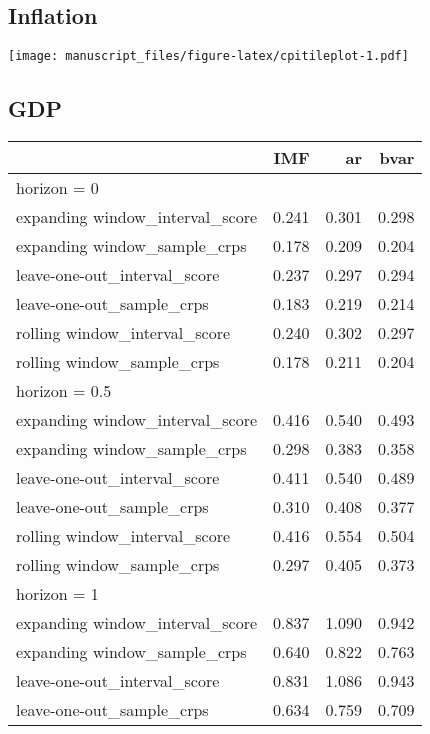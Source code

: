 \documentclass[
]{article}
\begin{document}
\hypertarget{inflation-2}{%
\subsection{Inflation}\label{inflation-2}}

\texttt{[image: manuscript\_files/figure-latex/cpitileplot-1.pdf]}

\hypertarget{gdp-2}{%
\subsection{GDP}\label{gdp-2}}

\begin{longtable}{l|rrr}
\toprule
\multicolumn{1}{l}{} & IMF & ar & bvar \\ 
\midrule
\multicolumn{4}{l}{horizon = 0} \\ 
\midrule
expanding window\_interval\_score & 0.241 & 0.301 & 0.298 \\ 
expanding window\_sample\_crps & 0.178 & 0.209 & 0.204 \\ 
leave-one-out\_interval\_score & 0.237 & 0.297 & 0.294 \\ 
leave-one-out\_sample\_crps & 0.183 & 0.219 & 0.214 \\ 
rolling window\_interval\_score & 0.240 & 0.302 & 0.297 \\ 
rolling window\_sample\_crps & 0.178 & 0.211 & 0.204 \\ 
\midrule
\multicolumn{4}{l}{horizon = 0.5} \\ 
\midrule
expanding window\_interval\_score & 0.416 & 0.540 & 0.493 \\ 
expanding window\_sample\_crps & 0.298 & 0.383 & 0.358 \\ 
leave-one-out\_interval\_score & 0.411 & 0.540 & 0.489 \\ 
leave-one-out\_sample\_crps & 0.310 & 0.408 & 0.377 \\ 
rolling window\_interval\_score & 0.416 & 0.554 & 0.504 \\ 
rolling window\_sample\_crps & 0.297 & 0.405 & 0.373 \\ 
\midrule
\multicolumn{4}{l}{horizon = 1} \\ 
\midrule
expanding window\_interval\_score & 0.837 & 1.090 & 0.942 \\ 
expanding window\_sample\_crps & 0.640 & 0.822 & 0.763 \\ 
leave-one-out\_interval\_score & 0.831 & 1.086 & 0.943 \\ 
leave-one-out\_sample\_crps & 0.634 & 0.759 & 0.709 \\ 

\end{longtable}
\end{document}
